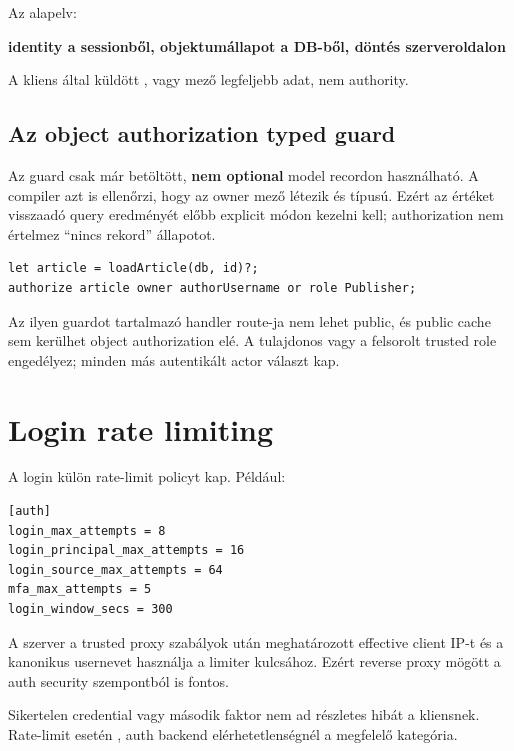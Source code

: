 Az alapelv:

\begin{center}
\textbf{identity a sessionből, objektumállapot a DB-ből, döntés szerveroldalon}
\end{center}

A kliens által küldött ,  vagy  mező legfeljebb adat, nem authority.

\subsection*{Az object authorization typed guard}

Az  guard csak már betöltött, \textbf{nem optional} model recordon használható. A compiler azt is ellenőrzi, hogy az owner mező létezik és  típusú. Ezért az  értéket visszaadó query eredményét előbb explicit módon kezelni kell; authorization nem értelmez ``nincs rekord'' állapotot.

\begin{lstlisting}[language=Velran]
let article = loadArticle(db, id)?;
authorize article owner authorUsername or role Publisher;
\end{lstlisting}

Az ilyen guardot tartalmazó handler route-ja nem lehet public, és public cache sem kerülhet object authorization elé. A tulajdonos vagy a felsorolt trusted role engedélyez; minden más autentikált actor  választ kap.

\section{Login rate limiting}

A login külön rate-limit policyt kap. Például:

\begin{lstlisting}
[auth]
login_max_attempts = 8
login_principal_max_attempts = 16
login_source_max_attempts = 64
mfa_max_attempts = 5
login_window_secs = 300
\end{lstlisting}

A szerver a trusted proxy szabályok után meghatározott effective client IP-t és a kanonikus usernevet használja a limiter kulcsához. Ezért reverse proxy mögött a  auth security szempontból is fontos.

Sikertelen credential vagy második faktor nem ad részletes hibát a kliensnek. Rate-limit esetén , auth backend elérhetetlenségnél  a megfelelő kategória.

